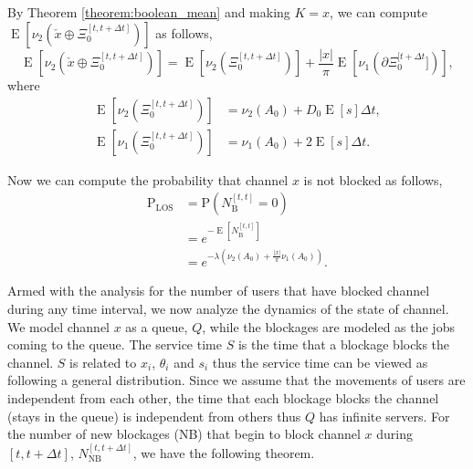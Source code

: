 \documentclass[10pt, conference, letterpaper]{IEEEtran}
\DeclareMathOperator*{\E}{\mathrm{E}}
\begin{document}
By Theorem \ref{theorem:boolean_mean} and making $K = x$, we can compute $\E[\nu_2(\check{x}\oplus\Xi_0^{[t, t+\Delta t]})]$ as follows,
\begin{equation}\label{eq:boolean_mean}
\E[\nu_2(\check{x}\oplus\Xi_0^{[t, t+\Delta t]})] = \E[\nu_2(\Xi_0^{[t, t+\Delta t]})] + \frac{|x|}{\pi}\E[\nu_1(\partial \Xi_0^{[t + \Delta t}])],
\end{equation}
where
\begin{equation*}
\begin{split}
\E[\nu_2(\Xi_0^{[t, t+\Delta t]})] & = \nu_2(A_0) + D_0\E[s]\Delta t,\\
\E[\nu_1(\Xi_0^{[t, t+\Delta t]})] & = \nu_1(A_0) + 2\E[s]\Delta t.
\end{split}
\end{equation*}

Now we can compute the probability that channel $x$ is not blocked as follows, 
\begin{equation}\label{eq:P_LOS}
\begin{aligned}
\mathrm{P}_{\mathrm{LOS}} & = \mathrm{P}(N_{\mathrm{B}}^{[t, t]}=0)  \\
& = e^{-\E[N_\mathrm{B}^{[t,t]}]} \\
& = e^{-\lambda(\nu_2(A_0) + \frac{|x|}{\pi}\nu_1(A_0))}. 
\end{aligned}
\end{equation}

Armed with the analysis for the number of users that have blocked channel during any time interval, we now analyze the dynamics of the state of channel. We model channel $x$ as a queue, $Q$, while the blockages are modeled as the jobs coming to the queue. 
The service time $S$ is the time that a blockage blocks the channel. $S$ is related to $x_i$, $\theta_i$ and $s_i$ thus the service time can be viewed as following a general distribution. Since we assume that the movements of users are independent from each other, the time that each blockage blocks the channel (stays in the queue) is independent from others thus $Q$ has infinite servers. For the number of new blockages (NB) that begin to block channel $x$ during $[t, t+\Delta t]$, $N_{\mathrm{NB}}^{[t, t+\Delta t]}$, we have the following theorem.
\end{document}
